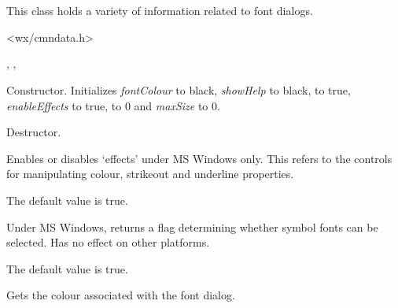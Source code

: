 \section{}\label{wxfontdata}


This class holds a variety of information related to font dialogs.




<wx/cmndata.h>


, , 




Constructor. Initializes {\it fontColour} to black, {\it showHelp} to black,
 to true, {\it enableEffects} to true,
 to 0 and {\it maxSize} to 0.



Destructor.



Enables or disables `effects' under MS Windows only. This refers to the
controls for manipulating colour, strikeout and underline properties.

The default value is true.



Under MS Windows, returns a flag determining whether symbol fonts can be selected. Has no
effect on other platforms.

The default value is true.



Gets the colour associated with the font dialog.

